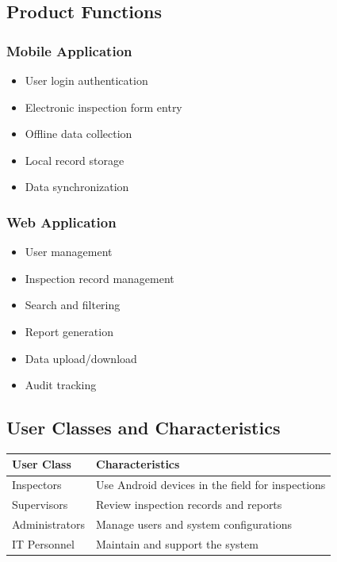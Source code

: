 \documentclass[12pt]{article}
\begin{document}
\subsection{Product Functions}

\subsubsection*{Mobile Application}

\begin{itemize}
\item User login authentication
\item Electronic inspection form entry
\item Offline data collection
\item Local record storage
\item Data synchronization
\end{itemize}

\subsubsection*{Web Application}

\begin{itemize}
\item User management
\item Inspection record management
\item Search and filtering
\item Report generation
\item Data upload/download
\item Audit tracking
\end{itemize}

\subsection{User Classes and Characteristics}

\begin{longtable}{|p{4cm}|p{8cm}|}
\hline
User Class & Characteristics \\ \hline
Inspectors & Use Android devices in the field for inspections \\ \hline
Supervisors & Review inspection records and reports \\ \hline
Administrators & Manage users and system configurations \\ \hline
IT Personnel & Maintain and support the system \\ \hline
\end{longtable}
\end{document}
